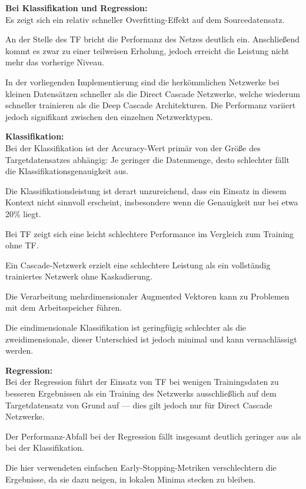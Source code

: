 \textbf{Bei Klassifikation und Regression:}\\
Es zeigt sich ein relativ schneller Overfitting-Effekt auf dem Sourcedatensatz.

An der Stelle des TF bricht die Performanz des Netzes deutlich ein. Anschließend kommt es zwar zu einer teilweisen Erholung, 
jedoch erreicht die Leistung nicht mehr das vorherige Niveau.

In der vorliegenden Implementierung sind die herkömmlichen Netzwerke bei kleinen Datensätzen schneller als die Direct Cascade Netzwerke, welche 
wiederum schneller trainieren als die Deep Cascade Architekturen. Die Performanz variiert jedoch signifikant zwischen den einzelnen Netzwerktypen.

\textbf{Klassifikation:}\\
Bei der Klassifikation ist der Accuracy-Wert primär von der Größe des Targetdatensatzes abhängig: Je geringer die Datenmenge, desto 
schlechter fällt die Klassifikationsgenauigkeit aus.

Die Klassifikationsleistung ist derart unzureichend, dass ein Einsatz in diesem Kontext nicht sinnvoll erscheint, insbesondere wenn die 
Genauigkeit nur bei etwa 20\% liegt.

Bei TF zeigt sich eine leicht schlechtere Performance im Vergleich zum Training ohne TF.

Ein Cascade-Netzwerk erzielt eine schlechtere Leistung als ein vollständig trainiertes Netzwerk ohne Kaskadierung.

Die Verarbeitung mehrdimensionaler Augmented Vektoren kann zu Problemen mit dem Arbeitsspeicher führen.

Die eindimensionale Klassifikation ist geringfügig schlechter als die zweidimensionale, dieser Unterschied ist jedoch minimal und kann 
vernachlässigt werden.

\textbf{Regression:}\\
Bei der Regression führt der Einsatz von TF bei wenigen Trainingsdaten zu besseren Ergebnissen als ein Training des Netzwerks ausschließlich 
auf dem Targetdatensatz von Grund auf — dies gilt jedoch nur für Direct Cascade Netzwerke.

Der Performanz-Abfall bei der Regression fällt insgesamt deutlich geringer aus als bei der Klassifikation.

Die hier verwendeten einfachen Early-Stopping-Metriken verschlechtern die Ergebnisse, da sie dazu neigen, in lokalen Minima stecken zu bleiben.
